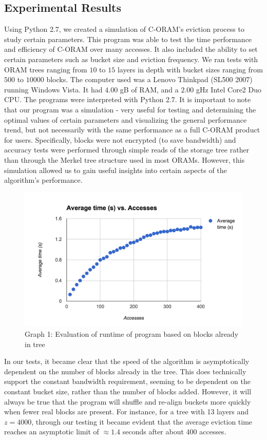 \documentclass[12pt, oneside]{article}   	%
\begin{document}
\subsection{Experimental Results}

Using Python 2.7, we created a simulation of C-ORAM's eviction process to study certain parameters. This program was able to test the time performance and efficiency of C-ORAM over many accesses. It also included the ability to set certain parameters such as bucket size and eviction frequency. We ran tests with ORAM trees ranging from $10$ to $15$ layers in depth with bucket sizes ranging from $500$ to $10000$ blocks. The computer used was a Lenovo Thinkpad (SL500 2007) running Windows Vista. It had $4.00$ gB of RAM, and a $2.00$ gHz Intel Core2 Duo CPU. The programs were interpreted with Python 2.7. It is important to note that our program was a simulation - very useful for testing and determining the optimal values of certain parameters and visualizing the general performance trend, but not necessarily with the same performance as a full C-ORAM product for users. Specifically, blocks were not encrypted (to save bandwidth) and accuracy tests were performed through simple reads of the storage tree rather than through the Merkel tree structure used in most ORAMs. However, this simulation allowed us to gain useful insights into certain aspects of the algorithm's performance.

\begin{figure}[H]
  \includegraphics[width=\linewidth]{runtimegraph}
  \caption{Graph 1: Evaluation of runtime of program based on blocks already in tree}
  \label{fig:runtimegraph}
\end{figure}

In our tests, it became clear that the speed of the algorithm is asymptotically dependent on the number of blocks already in the tree. This does technically support the constant bandwidth requirement, seeming to be dependent on the constant bucket size, rather than the number of blocks added. However, it will always be true that the program will shuffle and re-align buckets more quickly when fewer real blocks are present. For instance,  for a tree with 13 layers and $z = 4000$, through our testing it became evident that the average eviction time reaches an asymptotic limit of $\approx 1.4$ seconds after about 400 accesses. 
\end{document}
